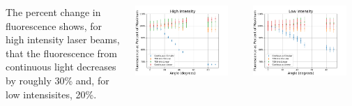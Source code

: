 \documentclass[
30pt,%
a1paper, 
landscape,%
margin = 0mm,
innermargin = -2cm,
colspace = 5mm,
subcolspace = 0mm,
blockverticalspace=.5cm %
]{tikzposter}
\begin{document}
\begin{columns}
{		The percent change in fluorescence shows, for high intensity laser beams, that the fluorescence from continuous light decreases by roughly 30\% and, for low intensisites, 20\%. 

		\begin{minipage}{.15\textwidth}
		\begin{tikzfigure}[]
			\includegraphics[width=0.9\textwidth]{../MRPData/MAR24/togetherscaled.pdf}
		\end{tikzfigure}
		\end{minipage}
		\begin{minipage}{.15\textwidth}
		\begin{tikzfigure}[]
			\includegraphics[width=0.9\textwidth]{../MRPData/April16/togetherscaled.pdf}
		\end{tikzfigure}
		\end{minipage}


}
\end{columns}
\end{document}
